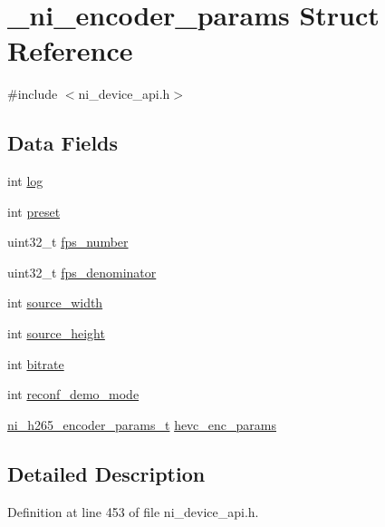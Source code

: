 \hypertarget{struct__ni__encoder__params}{}\section{\+\_\+ni\+\_\+encoder\+\_\+params Struct Reference}
\label{struct__ni__encoder__params}


{\ttfamily \#include $<$ni\+\_\+device\+\_\+api.\+h$>$}

\subsection*{Data Fields}
\begin{DoxyCompactItemize}
\item 
int \mbox{\hyperlink{struct__ni__encoder__params_a4fe6497d2ca697003ddd3e2f1f8ec44f}{log}}
\item 
int \mbox{\hyperlink{struct__ni__encoder__params_a2e9d3076c7fd698357ca478e223b7286}{preset}}
\item 
uint32\+\_\+t \mbox{\hyperlink{struct__ni__encoder__params_a7eb53fb6914d484d437bbaa8a11b8433}{fps\+\_\+number}}
\item 
uint32\+\_\+t \mbox{\hyperlink{struct__ni__encoder__params_a31f2d4e1489807a7553adcb5cc83e44a}{fps\+\_\+denominator}}
\item 
int \mbox{\hyperlink{struct__ni__encoder__params_a4ace2d09726597a7e529c3ba7be2983a}{source\+\_\+width}}
\item 
int \mbox{\hyperlink{struct__ni__encoder__params_a972c93682a2377d2a7b396ab0d89c349}{source\+\_\+height}}
\item 
int \mbox{\hyperlink{struct__ni__encoder__params_ab5d8e1788d02d0e52941a0778776e289}{bitrate}}
\item 
int \mbox{\hyperlink{struct__ni__encoder__params_a6286eade10a2d4a954acdb3d32f71509}{reconf\+\_\+demo\+\_\+mode}}
\item 
\mbox{\hyperlink{ni__device__api_8h_a9ed113908cee0b8c3d4d83cc6845a8da}{ni\+\_\+h265\+\_\+encoder\+\_\+params\+\_\+t}} \mbox{\hyperlink{struct__ni__encoder__params_a48f2fb1f44ce8aa7b44c6a32f7eeff19}{hevc\+\_\+enc\+\_\+params}}
\end{DoxyCompactItemize}


\subsection{Detailed Description}


Definition at line 453 of file ni\+\_\+device\+\_\+api.\+h.




